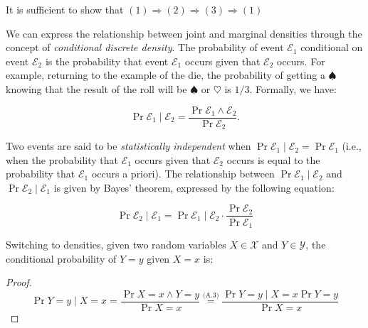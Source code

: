 It is sufficient to show that $(1) \Rightarrow (2) \Rightarrow (3) \Rightarrow (1)$




\begin{tcolorbox}[colframe=black, colback=white, sharp corners]
	
We can express the relationship between joint and marginal densities through the concept of \textit{conditional discrete density}. The probability of event $\mathcal{E}_1$ conditional on event $\mathcal{E}_2$ is the probability that event $\mathcal{E}_1$ occurs given that $\mathcal{E}_2$ occurs. For example, returning to the example of the die, the probability of getting a $\spadesuit$ knowing that the result of the roll will be $\spadesuit$ or $\heartsuit$ is $1/3$. Formally, we have:

\[
\Pr{\mathcal{E}_1 \mid \mathcal{E}_2} = \frac{\Pr{\mathcal{E}_1 \land \mathcal{E}_2}}{\Pr{\mathcal{E}_2}}.
\]

Two events are said to be \textit{statistically independent} when $\Pr{\mathcal{E}_1 \mid \mathcal{E}_2} = \Pr{\mathcal{E}_1}$ (i.e., when the probability that $\mathcal{E}_1$ occurs given that $\mathcal{E}_2$ occurs is equal to the probability that $\mathcal{E}_1$ occurs a priori). The relationship between $\Pr{\mathcal{E}_1 \mid \mathcal{E}_2}$ and $\Pr{\mathcal{E}_2 \mid \mathcal{E}_1}$ is given by Bayes' theorem, expressed by the following equation:

\[
\Pr{\mathcal{E}_2 \mid \mathcal{E}_1} = \Pr{\mathcal{E}_1 \mid \mathcal{E}_2} \cdot \frac{\Pr{\mathcal{E}_2}}{\Pr{\mathcal{E}_1}} \tag{A.3}
\]

Switching to densities, given two random variables $X \in \mathcal{X}$ and $Y \in \mathcal{Y}$, the conditional probability of $Y = y$ given $X = x$ is:
\begin{proof}
\[
\Pr{Y = y \mid X = x} = \frac{\Pr{X = x \land Y = y}}{\Pr{X = x}} \stackrel{\text{(A.3)}}{=} \frac{\Pr{Y = y \mid X = x} \Pr{Y = y}}{\Pr{X = x}}
\]
\end{proof}
\end{tcolorbox}


